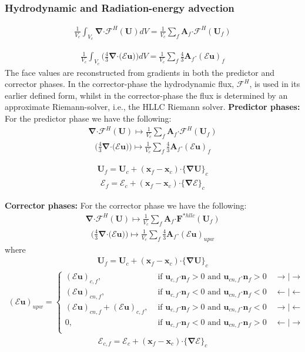 \documentclass[10pt,letterpaper,notitlepage]{article}
\numberwithin{equation}{section}
\newcommand{\bnabla}{\boldsymbol{\nabla}}
\newcommand{\position}{\mathbf{x}}
\newcommand{\velocity}{\mathbf{u}}
\newcommand{\dotp}{\boldsymbol{\cdot}}
\newcommand{\RadE}{\mathcal{E}}
\newcommand{\HydroF}{\mathcal{F}^H}
\newcommand{\HydroU}{\mathbf{U}}
\newcommand{\AreaVec}{\mathbf{A}}
\newcommand{\NormalVec}{\mathbf{n}}
\newcommand{\beqn}{\begin{equation}\begin{aligned}}
\newcommand{\eeqn}{\end{aligned}\end{equation}}
\begin{document}
\subsubsection{Hydrodynamic and Radiation-energy advection}
\label{section:fv_hydro_and_radE_advection}
\beqn 
\frac{1}{V_c} \int_{V_c} 
\bnabla \dotp \HydroF (\HydroU) 
dV = \frac{1}{V_c}
\sum_f \AreaVec_f \dotp  \HydroF(\HydroU_f)
\eeqn 

\beqn 
\frac{1}{V_c} \int_{V_c} 
\biggr(\frac{4}{3} \bnabla \dotp \bigr(\RadE \velocity)\biggr)
dV = \frac{1}{V_c}
\sum_f \frac{4}{3}  \AreaVec_f \dotp (\RadE \velocity)_f
\eeqn 
The face values are reconstructed from gradients in both the predictor and corrector phases. In the corrector-phase the hydrodynamic flux, $\HydroF$, is used in its earlier defined form, whilst in the corrector-phase the flux is determined by an approximate Riemann-solver, i.e., the HLLC Riemann solver.
\newline
\newline 
\textbf{Predictor phases:}\newline 
For the predictor phase we have the following:
\beqn 
\bnabla \dotp \HydroF (\HydroU)
\mapsto 
\frac{1}{V_c}
\sum_f \AreaVec_f \dotp  \HydroF(\HydroU_f)
\eeqn 
\beqn 
\biggr(\frac{4}{3} \bnabla \dotp \bigr(\RadE \velocity)\biggr)
\mapsto 
\frac{1}{V_c}
\sum_f \frac{4}{3}  \AreaVec_f \dotp (\RadE \velocity)_f
\eeqn 

\beqn 
\HydroU_f = \HydroU_c + (\position_f - \position_c) \dotp \{ \bnabla\HydroU \}_c
\eeqn 
\beqn 
\RadE_f = \RadE_c + (\position_f - \position_c) \dotp \{ \bnabla\RadE \}_c
\eeqn 

\noindent
\textbf{Corrector phases:}\newline
For the corrector phase we have the following:
\beqn 
\bnabla \dotp \HydroF (\HydroU)
\mapsto 
\frac{1}{V_c}
\sum_f \AreaVec_f \dotp  \mathbf{F}^{*hllc}(\HydroU_f)
\eeqn 
\beqn 
\biggr(\frac{4}{3} \bnabla \dotp \bigr(\RadE \velocity)\biggr)
\mapsto 
\frac{1}{V_c}
\sum_f \frac{4}{3}  \AreaVec_f \dotp (\RadE \velocity)_{upw}
\eeqn 
where
\beqn 
\HydroU_f = \HydroU_c+ (\position_f - \position_c) \dotp \{ \bnabla\HydroU \}_c
\eeqn  
\beqn
(\RadE \velocity)_{upw} =
\begin{cases}
	(\RadE \velocity)_{c,f} , &\text{ if } 
	\velocity_{c,f} \dotp  \NormalVec_f > 0 \text{ and } \velocity_{cn,f} \dotp  \NormalVec_f > 0 
	\quad  \rightarrow | \rightarrow \\
	(\RadE \velocity)_{cn,f} , &\text{ if } 
	\velocity_{c,f} \dotp  \NormalVec_f < 0 \text{ and } \velocity_{cn,f} \dotp  \NormalVec_f < 0
	\quad  \leftarrow | \leftarrow \\
	(\RadE \velocity)_{cn,f} + (\RadE \velocity)_{c,f}, &\text{ if } 
	\velocity_{c,f} \dotp  \NormalVec_f > 0 \text{ and } \velocity_{cn,f} \dotp  \NormalVec_f < 0 
	\quad  \rightarrow | \leftarrow \\
	0, &\text{ if } 
	\velocity_{c,f} \dotp  \NormalVec_f < 0 \text{ and } \velocity_{cn,f} \dotp  \NormalVec_f > 0
	\quad  \leftarrow | \rightarrow \\
\end{cases}
\eeqn 
\beqn 
\RadE_{c,f} = \RadE_c + (\position_f - \position_c) \dotp \{ \bnabla\RadE \}_c
\eeqn
\end{document}
